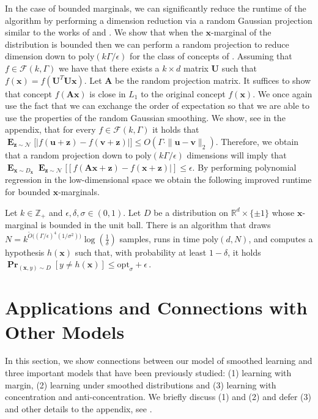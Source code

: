 \documentclass{theoretics}
\newcommand\twonorm[1]{\|#1\|_2}
\renewcommand\vec[1]{\mathbf{#1}}
\DeclareMathOperator*{\pr}{\mathbf{Pr}}
\DeclareMathOperator*{\E}{\mathbf{E}}
\newcommand{\normal}{\mathcal{N}}
\newcommand{\R}{\mathbb{R}}
\newcommand{\eps}{\epsilon}
\newcommand{\poly}{\mathrm{poly}}
\newcommand{\opt}{\mathrm{opt}}
\newcommand{\D}{D}
\newcommand{\1}{\Ind}
\newcommand{\x}{\vec x}
\renewcommand{\vv}{\vec v}
\newcommand{\vu}{\vec u}
\newcommand{\z}{\vec z}
\newcommand{\Gauss}{\mathcal{N}}
\newcommand{\Djoint}{D}
\begin{document}
In the case of bounded marginals, we can significantly reduce the runtime of the algorithm
by performing a dimension reduction via a random Gaussian projection similar to the
works of \cite{ArriagaVempala:99} and \cite{klivans-servedio-margin}.   We show that 
when the $\x$-marginal of the distribution is bounded then we can perform a random projection
to reduce dimension down to $\poly(k \Gamma/\eps)$ for the class of concepts of .  Assuming that $f\in \mathcal F(k, \Gamma)$ we have that there exists a $k\times d$ matrix 
$\vec U$ such that $f(\x) = f(\vec U^T \vec U \x)$.  Let $\vec A$ be the random projection matrix.
It suffices to show that concept $f(\vec A \vec x)$ is close in $L_1$ to the original concept $f(\x)$. 
We once again use the fact that we can exchange the order of expectation so that we are able to use
the properties of the random Gaussian smoothing.  We show, see  in the appendix, that for every $f \in \mathcal{F}(k, \Gamma)$ it holds that 
    $\E_{\z\sim \Gauss}\bigl[|f(\vu+\z)-f(\vv+\z)|\bigr]\leq O(\Gamma\cdot\twonorm{\vu-\vv})$.
    Therefore, we obtain that a random projection down to $\poly(k\Gamma/\epsilon)$ dimensions will imply
    that $\E_{\x \sim \D_\x}\E_{\vec z \sim \normal}[[f(\vec A \vec x+ \vec z) - f(\vec \x + \vec \z)|] \leq \eps$. By performing polynomial regression in the low-dimensional space we obtain the following improved
    runtime for bounded $\x$-marginals.
\begin{theorem}
\label{thm:random_proj_bounded_main}
    Let $k \in \mathbb Z_+$ and $\epsilon, \delta,\sigma \in (0,1)$. Let $D$ be a distribution on $\R^d\times \{\pm 1\}$ whose $\x$-marginal is bounded in the unit ball.  There is an algorithm that draws $N = k^{\tilde{O}\big((\Gamma/\epsilon)^4(1/\sigma^2)\big)}\log (\frac{1}{\delta})$ samples, runs in time $\poly(d,N)$, and computes a hypothesis $h(\x)$ such that, with probability at least $1-\delta$, it holds
    $ \pr_{(\x, y) \sim \Djoint}[y\neq h(\x)] \le \opt_\sigma + \eps\,$.
\end{theorem}




\section{Applications and Connections with Other Models}
In this section, we show connections between our model of smoothed learning and three important models that have been previously studied: (1) learning with margin, (2) learning under smoothed distributions and (3) learning with concentration and anti-concentration.  We briefly discuss (1) and (2) and defer (3) and other details to the appendix, see . 
\end{document}
